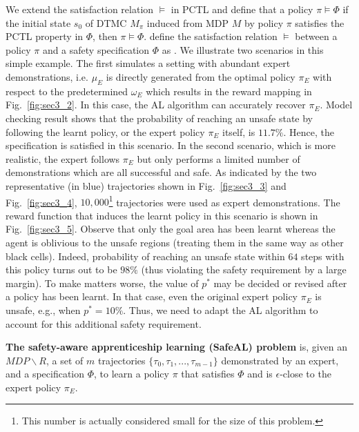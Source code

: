 We extend the satisfaction relation $\models$ in PCTL and define that a policy $\pi\models\Phi$ if the initial state $s_0$ of DTMC $M_\pi$ induced from MDP $M$ by policy $\pi$ satisfies the PCTL property in $\Phi$, then $\pi\models\Phi$. define the satisfaction relation $\models$ between a policy $\pi$ and a safety specification $\Phi$ as . We illustrate two scenarios in this simple example. The first simulates a setting with abundant expert demonstrations, i.e. $\mu_E$ is directly generated from the optimal policy $\pi_E$ with respect to the predetermined $\omega_E$ which results in the reward mapping in Fig.~\ref{fig:sec3_2}. In this case, the AL algorithm can accurately recover $\pi_E$. 
Model checking result shows that the probability of reaching an unsafe state by following the learnt policy, or the expert policy $\pi_E$ itself, is $11.7\%$. Hence, the specification is satisfied in this scenario. In the second scenario, which is more realistic, the expert follows $\pi_E$ but only performs a limited number of demonstrations which are all successful and safe. As indicated by the two representative (in blue) trajectories shown in Fig.~\ref{fig:sec3_3} and Fig.~\ref{fig:sec3_4}, $10,000$\footnote{This number is actually considered small for the size of this problem.} trajectories were used as expert demonstrations. 
The reward function that induces the learnt policy in this scenario is shown in Fig.~{\ref{fig:sec3_5}}.
Observe that only the goal area has been learnt whereas the agent is oblivious to the unsafe regions (treating them in the same way as other black cells). Indeed, probability of reaching an unsafe state within $64$ steps with this policy turns out to be $98\%$ (thus violating the safety requirement by a large margin).  
To make matters worse, the value of $p^*$ may be decided or revised after a policy has been learnt. In that case, even the original expert policy $\pi_E$ is unsafe, e.g., when $p^*=10\%$. 
Thus, we need to adapt the AL algorithm to account for this additional safety requirement. 
\begin{definition}
\textbf{The safety-aware apprenticeship learning (SafeAL) problem} is, given an $MDP\backslash R$, a set of $m$ trajectories $\{\tau_0, \tau_1, ..., \tau_{m-1}\}$ demonstrated by an expert, and a specification $\Phi$, to learn a policy $\pi$ that satisfies $\Phi$ and is $\epsilon$-close to the expert policy $\pi_E$.
\end{definition}
